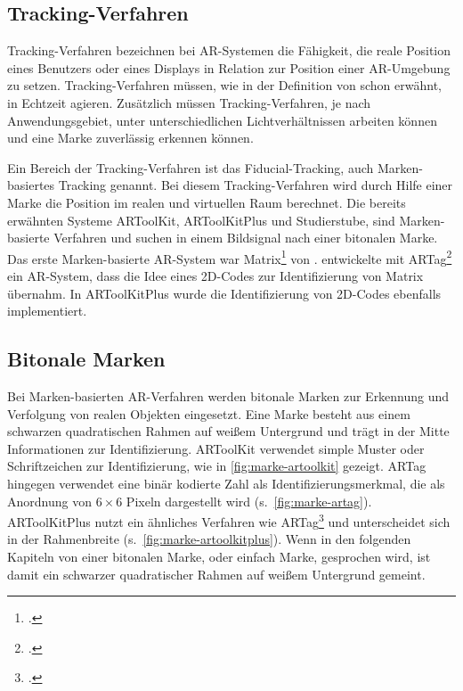 \subsection{Tracking-Verfahren} %
\label{sec:tracking_verfahren}
Tracking-Verfahren bezeichnen bei \gls{AR}-Systemen die Fähigkeit, die reale Position eines Benutzers oder eines
 Displays in Relation zur Position einer \gls{AR}-Umgebung zu setzen. Tracking-Verfahren müssen, wie in der Definition
 von \citeauthor{azuma97} schon erwähnt, in Echtzeit agieren. Zusätzlich müssen Tracking-Verfahren, je nach
 Anwendungsgebiet, unter unterschiedlichen Lichtverhältnissen arbeiten können und eine Marke zuverlässig erkennen
 können.

Ein Bereich der Tracking-Verfahren ist das Fiducial-Tracking, auch Marken-basiertes Tracking genannt. Bei diesem
 Tracking-Verfahren wird durch Hilfe einer Marke die Position im realen und virtuellen Raum berechnet. Die bereits
 erwähnten Systeme ARToolKit, ARToolKitPlus und Studierstube, sind Marken-basierte Verfahren und suchen in einem
 Bildsignal nach einer bitonalen Marke. Das erste Marken-basierte \gls{AR}-System war
 Matrix\footcite{rekimoto1998matrix} von \citeauthor{rekimoto1998matrix}. \citeauthor{fiala2004artaga} entwickelte mit
 ARTag\footcite{fiala2004artaga} ein \gls{AR}-System, dass die Idee eines 2D-Codes zur Identifizierung von Matrix
 übernahm. In ARToolKitPlus wurde die Identifizierung von 2D-Codes ebenfalls implementiert.

\subsection{Bitonale Marken} %
\label{sub:bitonalemarken}
Bei Marken-basierten \gls{AR}-Verfahren werden bitonale Marken zur Erkennung und Verfolgung von realen Objekten
 eingesetzt. Eine Marke besteht aus einem schwarzen quadratischen Rahmen auf weißem Untergrund und trägt in der Mitte
 Informationen zur Identifizierung. ARToolKit verwendet simple Muster oder Schriftzeichen zur Identifizierung, wie in
 \autoref{fig:marke-artoolkit} gezeigt. ARTag hingegen verwendet eine binär kodierte Zahl als Identifizierungsmerkmal,
 die als Anordnung von $6 \times 6$ Pixeln dargestellt wird (s.~\autoref{fig:marke-artag}). ARToolKitPlus nutzt ein
 ähnliches Verfahren wie ARTag\footcite[Vgl.][S.~142]{wagner07b} und unterscheidet sich in der Rahmenbreite
 (s.~\autoref{fig:marke-artoolkitplus}). Wenn in den folgenden Kapiteln von einer bitonalen Marke, oder einfach Marke,
 gesprochen wird, ist damit ein schwarzer quadratischer Rahmen auf weißem Untergrund gemeint.

